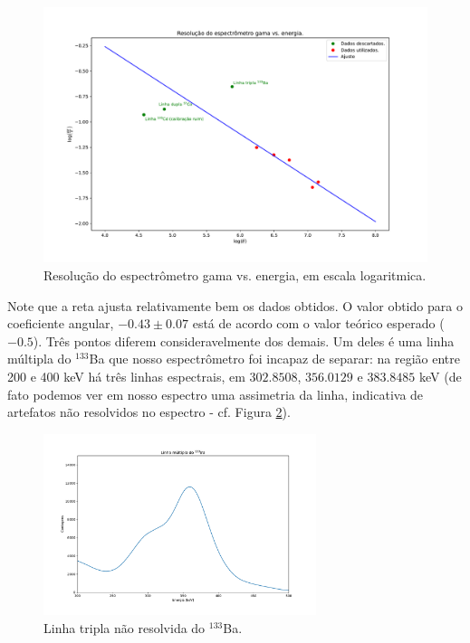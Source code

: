 \documentclass[a4paper, 11pt, notitlepage]{article}
\numberwithin{equation}{section}  %
\begin{document}
\begin{figure}[h]
  \centering
  \includegraphics[width=1.00\textwidth]{resolucao_loglog.pdf}
  \caption{Resolução do espectrômetro gama vs. energia, em escala logaritmica.}
  \label{fig:resolucao.loglog}
\end{figure}

Note que a reta ajusta relativamente bem os dados obtidos. O valor obtido para o coeficiente angular, $-0.43 \pm 0.07$ está de acordo com o valor teórico esperado ($-0.5$). Três pontos diferem consideravelmente dos demais. Um deles é uma linha múltipla do ${}^{133}$Ba que nosso espectrômetro foi incapaz de separar: na região entre 200 e 400 keV há três linhas espectrais, em $302.8508$, $356.0129$ e $383.8485$ keV (de fato podemos ver em nosso espectro uma assimetria da linha, indicativa de artefatos não resolvidos no espectro - cf. Figura \ref{fig:linha.tripla}). 

\begin{figure}[H]
  \centering
  \includegraphics[width=0.71\textwidth]{linhatripla.pdf}
  \caption{Linha tripla não resolvida do ${}^{133}$Ba.}
  \label{fig:linha.tripla}
\end{figure}
\end{document}
